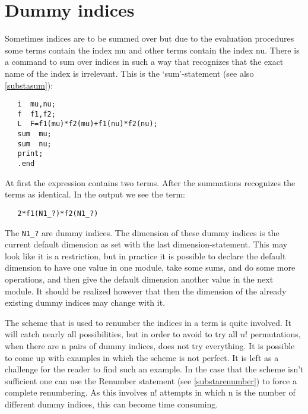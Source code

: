 \section{Dummy indices}

\label{sect-dummies}
Sometimes indices are to be summed over but due to the 
evaluation procedures some terms contain the index mu and other terms 
contain the index nu. There is a command to sum over indices in such a way 
that {\FORM} recognizes that the exact name of the index is irrelevant. 
This is the `sum'-statement (see also \ref{substasum}): \begin{verbatim}
   i  mu,nu;
   f  f1,f2;
   L  F=f1(mu)*f2(mu)+f1(nu)*f2(nu);
   sum  mu;
   sum  nu;
   print;
   .end
\end{verbatim}
At first the expression contains two terms. After the summations {\FORM} 
recognizes the terms as identical. In the output we see the term: 
\begin{verbatim}
   2*f1(N1_?)*f2(N1_?)
\end{verbatim}
The \verb:N1_?: are dummy indices. 
The dimension of these dummy indices is the current 
default dimension as set with the last 
dimension-statement. This may look like it is a restriction, but in 
practice it is possible to declare the default dimension to have one 
value in one module, take some sums, and do some more operations, and 
then give the default dimension another value in the next module. It should 
be realized however that then the dimension of the already existing dummy 
indices may change with it.

The scheme that is used to renumber the 
indices in a term is quite 
involved. It will catch nearly all possibilities, but in order to avoid 
to try all $n!$ permutations, when there are n pairs of dummy indices, 
{\FORM} does not try everything. It is possible to come up with examples 
in which the scheme is not perfect. It is left as a 
challenge for the reader to find such an example. In the case that the 
scheme isn't sufficient one can use the Renumber statement (see 
\ref{substarenumber}) to force a complete renumbering. As this involves 
n! attempts in which n is the number of different dummy indices, this can 
become time consuming.

